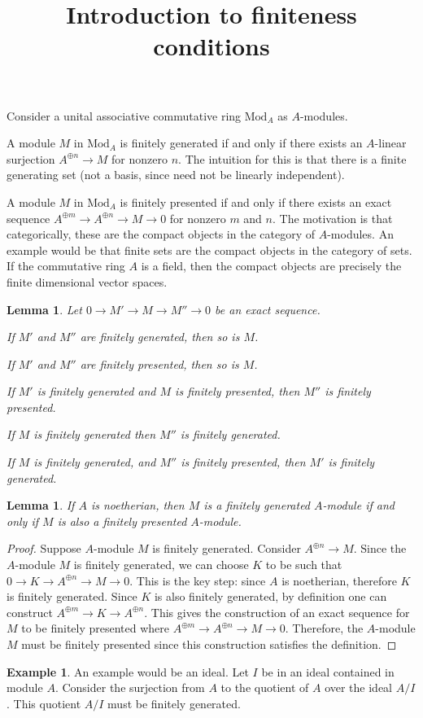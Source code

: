 \documentclass[10pt]{article}
\theoremstyle{plain}%
\newtheorem{lemma}[theorem]{Lemma}
\theoremstyle{definition}
\newtheorem{example}{Example}[section]
\theoremstyle{remark}
\begin{document}
\title{Introduction to finiteness conditions}

\maketitle

Consider a unital associative commutative ring $\mathrm{Mod}_A$ as $A$-modules. 

A module
$M$ in $\mathrm{Mod}_A$ is finitely generated 
if and only if there exists an $A$-linear
surjection $A^{\oplus n} \rightarrow M$
for nonzero $n$. The intuition for this is that there is a finite 
generating set (not a basis, since need not be linearly independent).

A module $M$ in 
$\mathrm{Mod}_A$ is finitely presented
if and only if there exists an exact sequence
$A^{\oplus m} \rightarrow A^{\oplus n} \rightarrow M \rightarrow 0$
for nonzero $m$ and $n$. The motivation is that categorically, 
these are the compact objects in the category of $A$-modules.
An example would be that finite sets are the compact objects in the category of sets.
If the commutative ring $A$ is a field, then the compact objects
are precisely the finite dimensional vector spaces.

\begin{lemma}
	Let $0 \rightarrow M' \rightarrow M \rightarrow M'' \rightarrow 0$
	be an exact sequence.
	
	If $M'$ and $M''$ are finitely generated, then so is $M$.
	
	If $M'$ and $M''$ are finitely presented, then so is $M$.
	
	If $M'$ is finitely generated and $M$ is finitely presented, then $M''$ is finitely presented.
	
	If $M$ is finitely generated then $M''$ is finitely generated.
	
	If $M$ is finitely generated, and $M''$ is finitely presented, then $M'$ is finitely generated.
\end{lemma}

\begin{lemma}
	If $A$ is noetherian, then $M$ is a finitely generated $A$-module if and only if $M$ is also a finitely presented $A$-module.
\end{lemma}

\begin{proof}
	Suppose $A$-module $M$ is finitely generated. 
	Consider $A^{\oplus n} \rightarrow M$. 
	Since the $A$-module $M$ is finitely generated, we 
	can choose $K$ to be such that
	$0 \rightarrow K \rightarrow A^{\oplus n} \rightarrow M \rightarrow 0$. 
	This is the key step: since $A$ is noetherian, therefore $K$ is finitely generated. 
	Since $K$ is also finitely generated, by definition one can construct 
	$A^{\oplus m} \rightarrow K \rightarrow A^{\oplus n}$.
	This gives the construction of an exact sequence 
	for $M$ to be finitely presented 
	where $A^{\oplus m} \rightarrow A^{\oplus n} \rightarrow M \rightarrow 0$.
	Therefore, the $A$-module $M$ must be finitely presented since this 
	construction satisfies the definition.
\end{proof}

\begin{example}
	An example would be an ideal. Let $I$ be in an ideal
contained in module $A$. Consider the surjection from $A$ to the 
quotient of $A$ over the ideal $A/I$. 
This quotient $A/I$ must be finitely generated.
\end{example}
\end{document}
